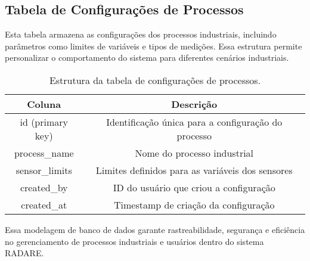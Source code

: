 \subsection{Tabela de Configurações de Processos}

Esta tabela armazena as configurações dos processos industriais, incluindo parâmetros como limites de variáveis e tipos de medições. Essa estrutura permite personalizar o comportamento do sistema para diferentes cenários industriais.

\begin{table}[htbp]
    \centering
    \caption{Estrutura da tabela de configurações de processos.}
    \label{Tab:ProcessConfigurations}
    \begin{tabular}{|c|c|}
        \hline
        \textbf{Coluna} & \textbf{Descrição} \\ \hline
        id (primary key) & Identificação única para a configuração do processo \\ \hline
        process\_name & Nome do processo industrial \\ \hline
        sensor\_limits & Limites definidos para as variáveis dos sensores \\ \hline
        created\_by & ID do usuário que criou a configuração \\ \hline
        created\_at & Timestamp de criação da configuração \\ \hline
    \end{tabular}
\end{table}

Essa modelagem de banco de dados garante rastreabilidade, segurança e eficiência no gerenciamento de processos industriais e usuários dentro do sistema RADARE.
